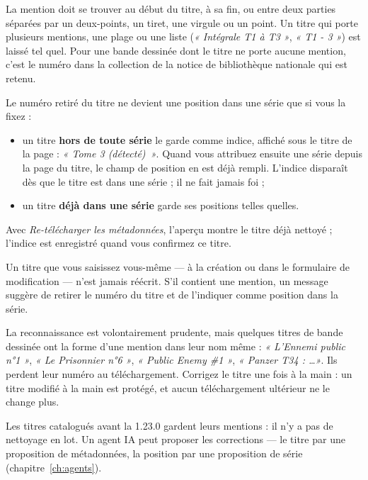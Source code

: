 La mention doit se trouver au début du titre, à sa fin, ou entre deux
parties séparées par un deux-points, un tiret, une virgule ou un point.
Un titre qui porte plusieurs mentions, une plage ou une liste
(\emph{« Intégrale T1 à T3 »}, \emph{« T1 - 3 »}) est laissé tel quel.
Pour une bande dessinée dont le titre ne porte aucune mention, c'est le
numéro dans la collection de la notice de bibliothèque nationale qui
est retenu.

Le numéro retiré du titre ne devient une position dans une série que
si vous la fixez :

\begin{itemize}
  \item un titre \textbf{hors de toute série} le garde comme indice,
        affiché sous le titre de la page : \emph{« Tome 3 (détecté)~»}. Quand vous attribuez ensuite une série depuis la page du
        titre, le champ de position en est déjà rempli. L'indice
        disparaît dès que le titre est dans une série ; il ne fait
        jamais foi ;
  \item un titre \textbf{déjà dans une série} garde ses positions
        telles quelles.
\end{itemize}

Avec \emph{Re-télécharger les métadonnées}, l'aperçu montre le titre
déjà nettoyé ; l'indice est enregistré quand vous confirmez ce titre.

Un titre que vous saisissez vous-même --- à la création ou dans le
formulaire de modification --- n'est jamais réécrit. S'il contient une
mention, un message suggère de retirer le numéro du titre et de
l'indiquer comme position dans la série.

\begin{warning}
La reconnaissance est volontairement prudente, mais quelques titres de
bande dessinée ont la forme d'une mention dans leur nom même :
\emph{« L'Ennemi public n°1 »}, \emph{« Le Prisonnier n°6 »},
\emph{« Public Enemy \#1 »}, \emph{« Panzer T34 : \dots »}. Ils perdent
leur numéro au téléchargement. Corrigez le titre une fois à la main :
un titre modifié à la main est protégé, et aucun téléchargement
ultérieur ne le change plus.
\end{warning}

Les titres catalogués avant la 1.23.0 gardent leurs mentions : il n'y a
pas de nettoyage en lot. Un agent IA peut proposer les corrections ---
le titre par une proposition de métadonnées, la position par une
proposition de série (chapitre~\ref{ch:agents}).

